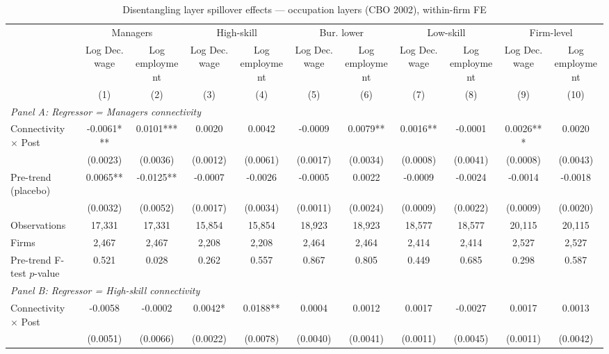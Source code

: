 \begin{table}[H]
\centering
\caption{Disentangling layer spillover effects --- occupation layers (CBO 2002), within-firm FE}
\label{tab:disentangle_occ4}
\scriptsize
\begin{threeparttable}
\begin{tabular}{lcccccccccc}
\toprule\toprule
 & \multicolumn{2}{c}{Managers} & \multicolumn{2}{c}{High-skill} & \multicolumn{2}{c}{Bur. lower} & \multicolumn{2}{c}{Low-skill} & \multicolumn{2}{c}{Firm-level} \\
\cmidrule(lr){2-3} \cmidrule(lr){4-5} \cmidrule(lr){6-7} \cmidrule(lr){8-9} \cmidrule(lr){10-11}
 & Log Dec. wage & Log employment & Log Dec. wage & Log employment & Log Dec. wage & Log employment & Log Dec. wage & Log employment & Log Dec. wage & Log employment \\
 & (1) & (2) & (3) & (4) & (5) & (6) & (7) & (8) & (9) & (10) \\
\midrule
\multicolumn{11}{l}{\textit{Panel A: Regressor = Managers connectivity}} \\
\quad Connectivity $\times$ Post & -0.0061*** & 0.0101*** & 0.0020 & 0.0042 & -0.0009 & 0.0079** & 0.0016** & -0.0001 & 0.0026*** & 0.0020 \\
 & (0.0023) & (0.0036) & (0.0012) & (0.0061) & (0.0017) & (0.0034) & (0.0008) & (0.0041) & (0.0008) & (0.0043) \\
\quad Pre-trend (placebo) & 0.0065** & -0.0125** & -0.0007 & -0.0026 & -0.0005 & 0.0022 & -0.0009 & -0.0024 & -0.0014 & -0.0018 \\
 & (0.0032) & (0.0052) & (0.0017) & (0.0034) & (0.0011) & (0.0024) & (0.0009) & (0.0022) & (0.0009) & (0.0020) \\
\quad Observations & 17,331 & 17,331 & 15,854 & 15,854 & 18,923 & 18,923 & 18,577 & 18,577 & 20,115 & 20,115 \\
\quad Firms & 2,467 & 2,467 & 2,208 & 2,208 & 2,464 & 2,464 & 2,414 & 2,414 & 2,527 & 2,527 \\
\quad Pre-trend F-test $p$-value & 0.521 & 0.028 & 0.262 & 0.557 & 0.867 & 0.805 & 0.449 & 0.685 & 0.298 & 0.587 \\[6pt]
\multicolumn{11}{l}{\textit{Panel B: Regressor = High-skill connectivity}} \\
\quad Connectivity $\times$ Post & -0.0058 & -0.0002 & 0.0042* & 0.0188** & 0.0004 & 0.0012 & 0.0017 & -0.0027 & 0.0017 & 0.0013 \\
 & (0.0051) & (0.0066) & (0.0022) & (0.0078) & (0.0040) & (0.0041) & (0.0011) & (0.0045) & (0.0011) & (0.0042) \\

\end{tabular}
\end{threeparttable}
\end{table}
